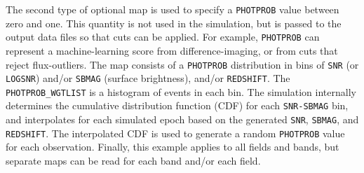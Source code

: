 \documentclass[12pt]{article}
\newcommand{\obs}{observation}
\begin{document}
{The second type of optional map is used to specify a {\tt PHOTPROB}
value between zero and one. This quantity is not used in the simulation,
but is passed to the output data files so that cuts can be applied.
For example, {\tt PHOTPROB} can represent a machine-learning score 
from difference-imaging, or from cuts that reject flux-outliers.
The map consists of a {\tt PHOTPROB} distribution  in bins
of {\tt SNR} (or {\tt LOGSNR}) and/or {\tt SBMAG} (surface brightness),
and/or {\tt REDSHIFT}.
The {\tt PHOTPROB\_WGTLIST} is a histogram of events in each bin.
The simulation internally determines the cumulative distribution
function (CDF) for each {\tt SNR-SBMAG} bin, and interpolates
for each simulated epoch based on the generated 
{\tt SNR}, {\tt SBMAG}, and {\tt REDSHIFT}.
The interpolated CDF is used to generate a random {\tt PHOTPROB} value
for each \obs. Finally, this example applies to all fields and bands,
but separate maps can be read for each band and/or each field.

\newcommand{\NPHOTPROB}{N_{\rm PhotProb}}
\newcommand{\UNIRAN}{U[0,1]}

}
\end{document}
